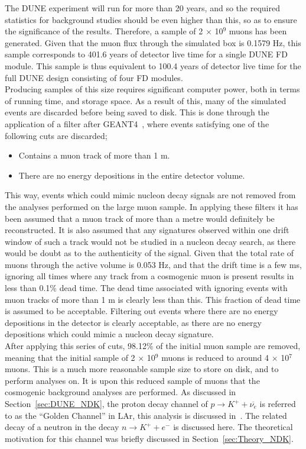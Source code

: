 The DUNE experiment will run for more than 20 years, and so the required statistics for background studies should be even higher than this, so as to ensure the significance of the results. Therefore, a sample of 2 $\times$ 10$^{9}$ muons has been generated. Given that the muon flux through the simulated box is 0.1579 Hz, this sample corresponds to 401.6 years of detector live time for a single DUNE FD module. This sample is thus equivalent to 100.4 years of detector live time for the full DUNE design consisting of four FD modules. \\

Producing samples of this size requires significant computer power, both in terms of running time, and storage space. As a result of this, many of the simulated events are discarded before being saved to disk. This is done through the application of a filter after GEANT4~\citep{GEANT4}, where events satisfying one of the following cuts are discarded;
\begin{itemize}
\item Contains a muon track of more than 1 m.
\item There are no energy depositions in the entire detector volume.
\end{itemize}
This way, events which could mimic nucleon decay signals are not removed from the analyses performed on the large muon sample. In applying these filters it has been assumed that a muon track of more than a metre would definitely be reconstructed. It is also assumed that any signatures observed within one drift window of such a track would not be studied in a nucleon decay search, as there would be doubt as to the authenticity of the signal. Given that the total rate of muons through the active volume is 0.053 Hz, and that the drift time is a few ms, ignoring all times where any track from a cosmogenic muon is present results in less than 0.1\% dead time. The dead time associated with ignoring events with muon tracks of more than 1 m is clearly less than this. This fraction of dead time is assumed to be acceptable. Filtering out events where there are no energy depositions in the detector is clearly acceptable, as there are no energy depositions which could mimic a nucleon decay signature. \\

After applying this series of cuts, 98.12\% of the initial muon sample are removed, meaning that the initial sample of 2 $\times$ 10$^9$ muons is reduced to around 4 $\times$ 10$^{7}$ muons. This is a much more reasonable sample size to store on disk, and to perform analyses on. It is upon this reduced sample of muons that the cosmogenic background analyses are performed. As discussed in Section~\ref{sec:DUNE_NDK}, the proton decay channel of $p \rightarrow K^{+} + \overline{\nu_{e}}$ is referred to as the ``Golden Channel'' in LAr, this analysis is discussed in~\citep{NDKTFNote}. The related decay of a neutron in the decay $n \rightarrow K^{+} + e^{-}$ is discussed here. The theoretical motivation for this channel was briefly discussed in Section~\ref{sec:Theory_NDK}. \\

